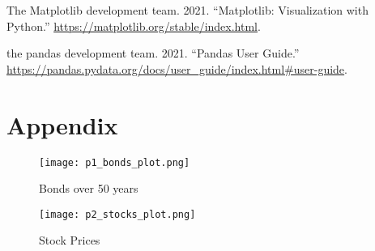 \documentclass[
  11pt,
]{article}
\begin{document}
\leavevmode\hypertarget{ref-matplot}{}%
The Matplotlib development team. 2021. ``Matplotlib: Visualization with Python.'' \url{https://matplotlib.org/stable/index.html}.

\leavevmode\hypertarget{ref-pandas}{}%
the pandas development team. 2021. ``Pandas User Guide.'' \url{https://pandas.pydata.org/docs/user_guide/index.html\#user-guide}.

\hypertarget{appendix}{%
\section*{Appendix}\label{appendix}}

\begin{figure}
\centering
\texttt{[image: p1\_bonds\_plot.png]}
\caption{Bonds over 50 years}
\end{figure}

\begin{figure}
\centering
\texttt{[image: p2\_stocks\_plot.png]}
\caption{Stock Prices}
\end{figure}
\end{document}
